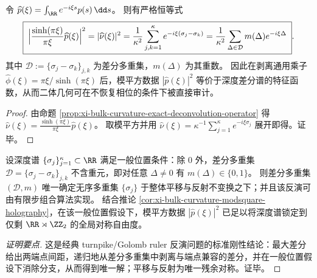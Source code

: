 \begin{corollary}\label{cor:xi-bulk-curvature-modsquare-holography}
令
\(
\widehat p(\xi)=\int_{\RR}e^{-i\xi s}p(s)\,\dd s
\)。
则有严格恒等式
\[
\boxed{\;
\Bigl|\frac{\sinh(\pi\xi)}{\pi\xi}\widehat p(\xi)\Bigr|^2
=|\widehat\nu(\xi)|^2
=\frac{1}{\kappa^2}\sum_{j,k=1}^{\kappa}e^{-i\xi(\sigma_j-\sigma_k)}
=\frac{1}{\kappa^2}\sum_{\Delta\in\mathcal D}m(\Delta)e^{-i\xi\Delta}\; }.
\]
其中 \(\mathcal D:=\{\sigma_j-\sigma_k\}_{j,k}\) 为差分多重集，\(m(\Delta)\) 为其重数。
因此在剥离通用乘子 \(\widehat\phi(\xi)=\pi\xi/\sinh(\pi\xi)\) 后，模平方数据 \(|\widehat p(\xi)|^2\) 等价于深度差分谱的特征函数，从而二体几何可在不恢复相位的条件下被直接审计。
\end{corollary}
\begin{proof}
由命题 \ref{prop:xi-bulk-curvature-exact-deconvolution-operator} 得
\(
\widehat\nu(\xi)=\frac{\sinh(\pi\xi)}{\pi\xi}\widehat p(\xi)
\)。
取模平方并用
\(
\widehat\nu(\xi)=\kappa^{-1}\sum_{j=1}^{\kappa}e^{-i\xi\sigma_j}
\)
展开即得。证毕。
\end{proof}

\begin{corollary}\label{cor:xi-bulk-curvature-difference-multiset-rigid-inversion}
设深度谱 \(\{\sigma_j\}_{j=1}^{\kappa}\subset\RR\) 满足一般位置条件：除 \(0\) 外，差分多重集 \(\mathcal D=\{\sigma_j-\sigma_k\}_{j,k}\) 不含重元，即对任意 \(\Delta\neq 0\) 有 \(m(\Delta)\in\{0,1\}\)。
则差分多重集 \((\mathcal D,m)\) 唯一确定无序多重集 \(\{\sigma_j\}\) 于整体平移与反射不变换之下；并且该反演可由有限步组合算法实现。
结合推论 \ref{cor:xi-bulk-curvature-modsquare-holography}，在该一般位置假设下，模平方数据 \(|\widehat p(\xi)|^{2}\) 已足以将深度谱锁定到仅剩 \(\RR\rtimes\ZZ_2\) 的全局对称自由度。
\end{corollary}
\begin{proof}[证明要点]
这是经典 turnpike/Golomb ruler 反演问题的标准刚性结论：最大差分给出两端点间距，递归地从差分多重集中剥离与端点兼容的差分，并在一般位置假设下消除分支，从而得到唯一解；平移与反射为唯一残余对称。证毕。
\end{proof}

